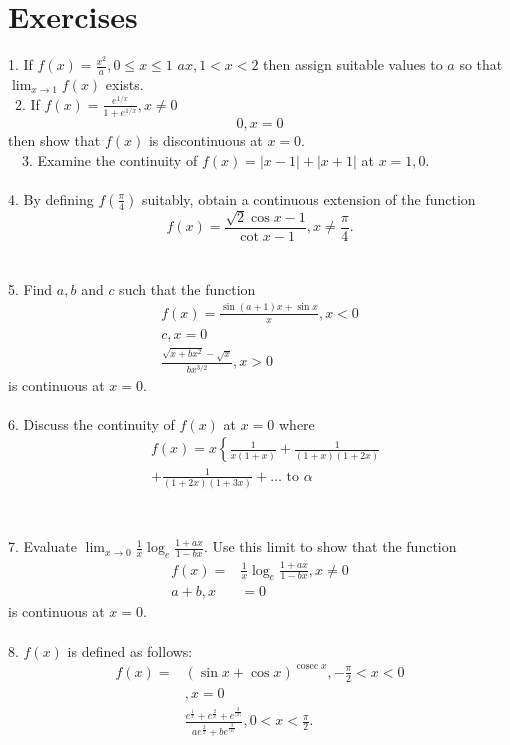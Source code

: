 \section{Exercises}

1. If $f(x)=\frac{x^2}{a}, 0 \leq x \leq 1$
$a x, 1<x<2$
then assign suitable values to $a$ so that $\lim _{x \rightarrow 1} f(x)$ exists.\\\
2. If $f(x)=\frac{e^{1 / x}}{1+e^{1 / x}}, x \neq 0$
$$
0, x=0
$$
then show that $f(x)$ is discontinuous at $x=0$.\\\
\
3. Examine the continuity of $f(x)=|x-1|+|x+1|$ at $x=1,0$.\\\\
4. By defining $f\left(\frac{\pi}{4}\right)$ suitably, obtain a continuous extension of the function
$$
f(x)=\frac{\sqrt{2} \cos x-1}{\cot x-1}, x \neq \frac{\pi}{4} .
$$\\\\
5. Find $a, b$ and $c$ such that the function
$$
\begin{gathered}
f(x)=\frac{\sin (a+1) x+\sin x}{x}, x<0 \\
c, x=0 \\
\frac{\sqrt{x+b x^2}-\sqrt{x}}{b x^{3 / 2}}, x>0
\end{gathered}
$$
is continuous at $x=0$.\\\\
6. Discuss the continuity of $f(x)$ at $x=0$ where
$$
\begin{aligned}
& f(x)=x\left\{\frac{1}{x(1+x)}+\frac{1}{(1+x)(1+2 x)}\right. \\
& +\frac{1}{(1+2 x)(1+3 x)}+\ldots \text { to } \alpha \\
&
\end{aligned}
$$\\\\
7. Evaluate $\lim _{x \rightarrow 0} \frac{1}{x} \log _e \frac{1+a x}{1-b x}$.
Use this limit to show that the function
$$
\begin{aligned}
f(x)= & \frac{1}{x} \log _e \frac{1+a x}{1-b x}, x \neq 0 \\
a+b, x & =0
\end{aligned}
$$
is continuous at $x=0$.\\\\
8. $f(x)$ is defined as follows:
$$
\begin{aligned}
f(x)= & (\sin x+\cos x)^{\operatorname{cosec} x},-\frac{\pi}{2}<x<0 \\
& , x=0 \\
& \frac{e^{\frac{1}{x}}+e^{\frac{2}{x}}+e^{\frac{3}{|x|}}}{a e^{\frac{2}{x}}+b e^{\frac{3}{|x|}}}, 0<x<\frac{\pi}{2} .
\end{aligned}
$$

